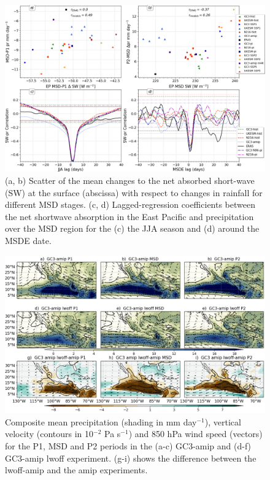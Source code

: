 \begin{figure}[t!]
\includegraphics[width=\linewidth]{figures/cloud_scatter_f.png}
\caption[Scatterplot and lagged-regression of surface short-wave]{(a, b) Scatter of the mean changes to the net absorbed short-wave (SW) at the surface (abscissa) with respect to changes in rainfall for different MSD stages. (c, d) Lagged-regression coefficients between the net shortwave absorption in the East Pacific and precipitation over the MSD region for the (c) the JJA season and (d) around the MSDE date.}
\label{fig:cloud_scatter}
\end{figure}



 
\begin{figure}[t!]
\includegraphics[width=\linewidth]{figures/lwfig_clim_1.png}
\caption[Composite moisture flux and wind speed]{Composite mean precipitation (shading in mm day$^{-1}$), vertical velocity (contours in 10$^{-2}$ Pa s$^{-1}$) and 850 hPa wind speed (vectors) for the P1, MSD and P2 periods in the (a-c) GC3-amip and (d-f) GC3-amip lwoff experiment. (g-i) shows the difference between the lwoff-amip and the amip experiments.}
\label{fig:lwoff}
\end{figure}

